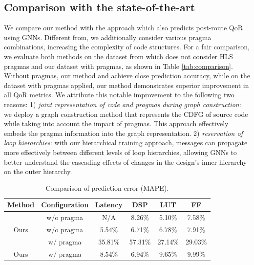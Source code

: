 \documentclass[conference]{IEEEtran}
\begin{document}
\subsection{Comparison with the state-of-the-art}
\vspace{-0.1cm} 

We compare our method with the approach \cite{wu2022high} which also predicts post-route QoR using GNNs. Different from\cite{wu2022high}, we additionally consider various pragma combinations, increasing the complexity of code structures. For a fair comparison, we evaluate both methods on the dataset from \cite{wu2022high} which does not consider HLS pragmas and our dataset with pragmas, as shown in Table \ref{tab:comparison}. Without pragmas, our method and \cite{wu2022high} achieve close prediction accuracy, while on the dataset with pragmas applied, our method demonstrates superior improvement in all QoR metrics. We attribute this notable improvement to the following two reasons: 1) \textit{joint representation of code and pragmas during graph construction}: we deploy a graph construction method that represents the CDFG of source code while taking into account the impact of pragmas. This approach effectively embeds the pragma information into the graph representation. 2) \textit{reservation of loop hierarchies}: with our hierarchical training approach, messages can propagate more effectively between different levels of loop hierarchies, allowing GNNs to better understand the cascading effects of changes in the design's inner hierarchy on the outer hierarchy.


\begin{table}
\caption{Comparison of prediction error (MAPE).}
\vspace{-0.2cm}
\label{tab:comparison}
\begin{center}
\begin{tabular}{cccccc}
\hline
\textbf{Method} & \textbf{Configuration} & \textbf{Latency} & \textbf{DSP} & \textbf{LUT} & \textbf{FF} \\ \hline
\cite{wu2022high}  & w/o pragma & N/A & 8.26\% & 5.10\% & 7.58\%  \\
Ours & w/o pragma & 5.54\% & 6.71\% & 6.78\% & 7.91\% \\
\hline
\cite{wu2022high}  & w/ pragma & 35.81\% & 57.31\% & 27.14\% & 29.03\% \\
Ours & w/ pragma & 8.54\% & 6.94\% & 9.65\% & 9.99\% \\     
\hline
\end{tabular}
\label{tab1}
\end{center}
\vspace{-0.5cm}
\end{table}
\end{document}
